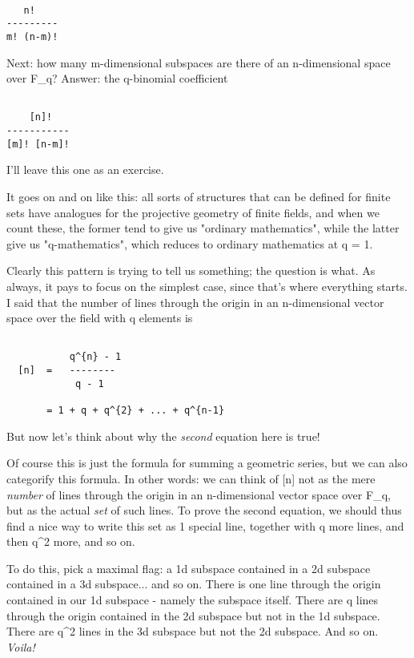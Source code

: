 \begin{verbatim}

   n! 
---------
m! (n-m)!
\end{verbatim}
    
Next: how many m-dimensional subspaces are there of an n-dimensional
space over F_{q}?  Answer: the q-binomial coefficient


\begin{verbatim}

    [n]! 
-----------
[m]! [n-m]!
\end{verbatim}
    
I'll leave this one as an exercise.

It goes on and on like this: all sorts of structures that can
be defined for finite sets have analogues for the projective
geometry of finite fields, and when we count these, the former
tend to give us "ordinary mathematics", while the latter give
us "q-mathematics", which reduces to ordinary mathematics at q = 1.

Clearly this pattern is trying to tell us something; the question 
is what.  As always, it pays to focus on the simplest case, since
that's where everything starts.  I said that the number of lines
through the origin in an n-dimensional vector space over the field
with q elements is


\begin{verbatim}

           q^{n} - 1
  [n]  =   --------   
            q - 1

       = 1 + q + q^{2} + ... + q^{n-1}
\end{verbatim}
    
But now let's think about why the \emph{second} equation here is true!  


Of course this is just the formula for summing a geometric series, but
we can also categorify this formula.  In other words: we can think of
[n] not as the mere \emph{number} of lines through the origin in an
n-dimensional vector space over F_{q}, but as the actual
\emph{set} of such lines.  To prove the second equation, we should
thus find a nice way to write this set as 1 special line, together with
q more lines, and then q^{2} more, and so on.

To do this, pick a maximal flag: a 1d subspace contained in a 2d
subspace contained in a 3d subspace... and so on.   There is one line
through the origin contained in our 1d subspace - namely the subspace
itself.   There are q lines through the origin contained in the 2d
subspace but not in the 1d subspace.  There are q^{2} lines in the 3d
subspace but not the 2d subspace.  And so on.  \emph{Voila!}

